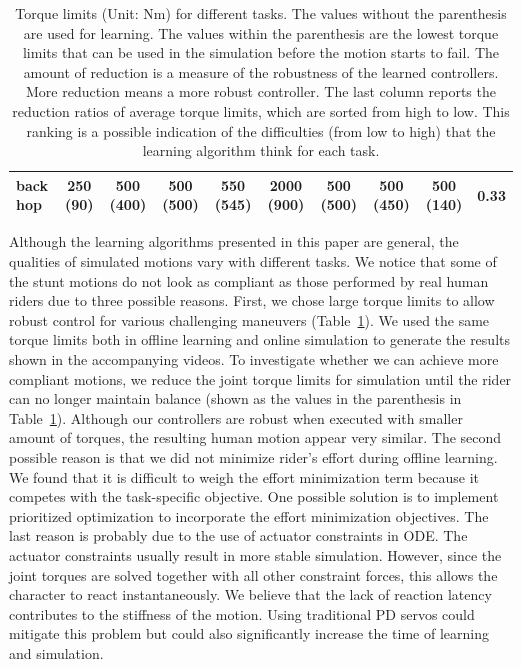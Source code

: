 \begin{table}[ht]
\begin{tabular}{|l|c|c|c|c|c|c|c|c|c|}
back hop & 250 (90) & 500 (400) & 500 (500) & 550 (545) & 2000 (900) & 500 (500) & 500 (450) & 500 (140) & 0.33\\
\hline
 \end{tabular}
 \caption{Torque limits (Unit: Nm) for different tasks. The values without the parenthesis are used for learning. The values within the parenthesis are the lowest torque limits that can be used in the simulation before the motion starts to fail. The amount of reduction is a measure of the robustness of the learned controllers. More reduction means a more robust controller. The last column reports the reduction ratios of average torque limits, which are sorted from high to low. This ranking is a possible indication of the difficulties (from low to high) that the learning algorithm think for each task. }
 \vspace{-0.1in}
 \label{table:torqueLimit}
 \end{table}


Although the learning algorithms presented in this paper are general, the qualities of simulated motions vary with different tasks. We notice that some of the stunt motions do not look as compliant as those performed by real human riders due to three possible reasons. First, we chose large torque limits to allow robust control for various challenging maneuvers (Table~\ref{table:torqueLimit}). We used the same torque limits both in offline learning and online simulation to generate the results shown in the accompanying videos. To investigate whether we can achieve more compliant motions, we reduce the joint torque limits for simulation until the rider can no longer maintain balance (shown as the values in the parenthesis in Table~\ref{table:torqueLimit}). Although our controllers are robust when executed with smaller amount of torques, the resulting human motion appear very similar. The second possible reason is that we did not minimize rider's effort during offline learning. We found that it is difficult to weigh the effort minimization term because it competes with the task-specific objective. One possible solution is to implement prioritized optimization \cite{delasa:2009} to incorporate the effort minimization objectives. The last reason is probably due to the use of actuator constraints in ODE. The actuator constraints usually result in more stable simulation. However, since the joint torques are solved together with all other constraint forces, this allows the character to react instantaneously. We believe that the lack of reaction latency contributes to the stiffness of the motion. Using traditional PD servos could mitigate this problem but could also significantly increase the time of learning and simulation.


